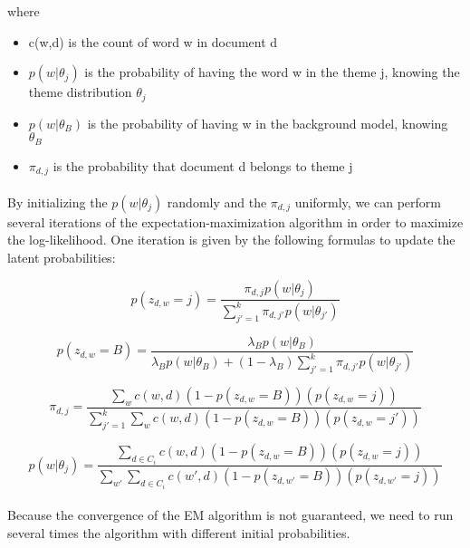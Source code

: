 where 

\begin{itemize}
\item c(w,d) is the count of word w in document d
\item $p(w|\theta_{j})$ is the probability of having the word w in the theme j, knowing the theme distribution $\theta_{j}$
\item $p(w|\theta_{B})$ is the probability of having w in the background model, knowing $\theta_{B}$
\item $\pi_{d,j}$ is the probability that document d belongs to theme j
\end{itemize}

\paragraph{}
By initializing the $p(w|\theta_{j})$ randomly and the $\pi_{d,j}$ uniformly, we can perform several iterations of the expectation-maximization algorithm in order to maximize the log-likelihood. One iteration is given by the following formulas to update the latent probabilities:

\begin{equation*}
p(z_{d,w} = j) = \frac{\pi_{d,j}p(w|\theta_{j})} {\sum_{j\prime=1}^{k} {\pi_{d,j\prime}p(w|\theta_{j\prime})} }
\end{equation*}

\begin{equation*}
p(z_{d,w} = B) = \frac
{\lambda_{B} p(w|\theta_{B})} 
{\lambda_{B} p(w|\theta_{B}) + (1-\lambda_{B})
\sum_{j\prime=1}^{k} {\pi_{d,j\prime}p(w|\theta_{j\prime})}}
\end{equation*}

\begin{equation*}
\pi_{d,j} = \frac
{\sum_{w}{c(w,d)(1-p(z_{d,w} = B))(p(z_{d,w} = j))}}
{\sum_{j\prime=1}^{k}{\sum_{w}{c(w,d)(1-p(z_{d,w} = B))(p(z_{d,w} = j\prime))}}}
\end{equation*}

\begin{equation*}
p(w|\theta_{j}) = \frac
{\sum_{d\in C_{i}}{c(w,d)(1-p(z_{d,w} = B))(p(z_{d,w} = j))}}
{\sum_{w\prime}{
\sum_{d \in C_{i}} {c(w\prime,d)(1-p(z_{d,w\prime} = B))(p(z_{d,w\prime} = j))}}}
\end{equation*}


\paragraph{}
Because the convergence of the EM algorithm is not guaranteed, we need to run several times the algorithm with different initial probabilities.

